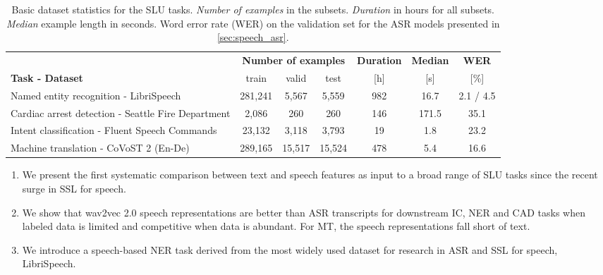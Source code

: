 \documentclass{article}
\begin{document}
\begin{table*}[t]
\begin{center}
\begin{tabular}{ l | c c c | c c c } 
\toprule

 & \multicolumn{3}{c|}{\textbf{Number of examples}} & \bf Duration & \bf Median & \bf WER \\
\textbf{Task - Dataset} & train & valid & test & [h] & [s] & [\%] \\

\midrule

Named entity recognition - LibriSpeech & 281,241 & 5,567 & 5,559 & 982 & 16.7 & 2.1 / 4.5 \\

Cardiac arrest detection - Seattle Fire Department & 2,086 & 260 & 260 & 146 & 171.5 & 35.1 \\

Intent classification - Fluent Speech Commands & 23,132 & 3,118 & 3,793 & 19 & 1.8 & 23.2 \\

Machine translation - CoVoST 2 (En-De) & 289,165 & 15,517 & 15,524 & 478 & 5.4 & 16.6 \\



\bottomrule
\end{tabular}
\end{center}
\vspace{-0.4cm}
\caption{Basic dataset statistics for the SLU tasks. \textit{Number of examples} in the subsets. \textit{Duration} in hours for all subsets. \textit{Median} example length in seconds. Word error rate (WER) on the validation set for the ASR models presented in \ref{sec:speech_asr}.} 
\label{tab:tasks}
\end{table*}

\begin{enumerate}
\setlength\itemsep{0mm}
\item We present the first systematic comparison between text and speech features as input to a broad range of SLU tasks since the recent surge in SSL for speech.
\item We show that wav2vec 2.0 speech representations are better than ASR transcripts for downstream IC, NER and CAD tasks when labeled data is limited and competitive when data is abundant. For MT, the speech representations fall short of text. 
\item We introduce a speech-based NER task derived from the most widely used dataset for research in ASR and SSL for speech, LibriSpeech.
\end{enumerate}
\end{document}

